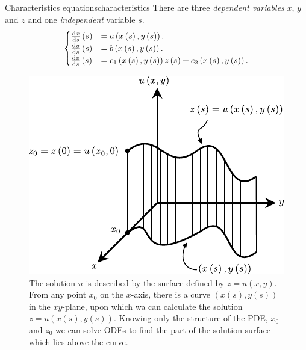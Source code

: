 \begin{definition}{Characteristics equations}{characteristics}
	There are three \emph{dependent variables} $x$, $y$ and $z$ and
	one \emph{independent} variable $s$.
	\begin{equation*}
		\begin{cases}
			\diff{x}{s}
			\left(s\right) & =
			a
			\left(
			x\left(s\right),
			y\left(s\right)
			\right).           \\
			\diff{y}{s}
			\left(s\right) & =
			b
			\left(
			x\left(s\right),
			y\left(s\right)
			\right).           \\
			\diff{z}{s}
			\left(s\right) & =
			c_{1}
			\left(
			x\left(s\right),
			y\left(s\right)
			\right)
			z
			\left(s\right)+
			c_{2}
			\left(
			x\left(s\right),
			y\left(s\right)
			\right).
		\end{cases}
	\end{equation*}
\end{definition}

\begin{figure}[ht!]
	\centering
	\includegraphics[width=0.35\paperwidth]{characteristics}
	\caption{The solution $u$ is described by the surface defined by
		$z=u\left(x,y\right)$.
		From any point $x_{0}$ on the $x$-axis, there is a curve
		$\left(x\left(s\right),y\left(s\right)\right)$ in the
		$xy$-plane, upon which wa can calculate the solution
		$z=u\left(x\left(s\right),y\left(s\right)\right)$.
		Knowing only the structure of the PDE, $x_{0}$ and $z_{0}$ we
		can solve ODEs to find the part of the solution surface which
		lies above the curve.}
\end{figure}

